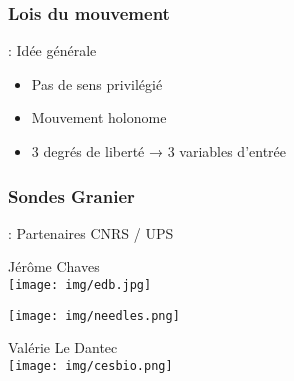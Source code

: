 \documentclass[12pt]{beamer}
\begin{document}
            \subsubsection{Lois du mouvement}
                \begin{frame}{\subsubsecname: Idée générale}
                    \begin{itemize}
                        \item Pas de sens privilégié
                        \item Mouvement holonome
                        \item 3 degrés de liberté → 3 variables d’entrée
                    \end{itemize}
                \end{frame}

            \subsubsection{Sondes Granier}
                \begin{frame}{\subsubsecname: Partenaires CNRS / UPS}
                    \begin{minipage}[t][1in][t]{3.5cm}\vspace{0pt}
                        Jérôme Chaves \\
                        \texttt{[image: img/edb.jpg]}
                    \end{minipage}
                    \begin{minipage}[t][1in][t]{3.5cm}\vspace{0pt}
                        \texttt{[image: img/needles.png]}
                    \end{minipage}
                    \begin{minipage}[t][1in][t]{3.5cm}\vspace{0pt}
                        Valérie Le Dantec \\
                        \texttt{[image: img/cesbio.png]}
                    \end{minipage}
                \end{frame}
\end{document}

